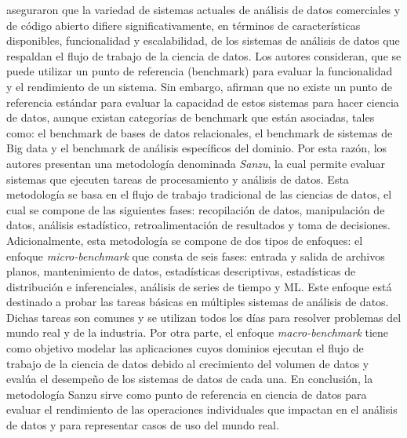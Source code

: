 \cite{Watson2017} aseguraron que la variedad de sistemas actuales de análisis de datos comerciales y de código abierto difiere significativamente, en términos de características disponibles, funcionalidad y escalabilidad, de los sistemas de análisis de datos que respaldan el flujo de trabajo de la ciencia de datos. Los autores consideran, que se puede utilizar un punto de referencia (benchmark) para evaluar la funcionalidad y el rendimiento de un sistema. Sin embargo, afirman que no existe un punto de referencia estándar para evaluar la capacidad de estos sistemas para hacer ciencia de datos, aunque existan categorías de benchmark que están asociadas, tales como: el benchmark de bases de datos relacionales, el benchmark de sistemas de Big data y el benchmark de análisis específicos del dominio. Por esta razón, los autores presentan una metodología denominada \textit{Sanzu}, la cual permite evaluar sistemas que ejecuten tareas de procesamiento y análisis de datos. Esta metodología se basa en el flujo de trabajo tradicional de las ciencias de datos, el cual se compone de las siguientes fases: recopilación de datos, manipulación de datos, análisis estadístico, retroalimentación de resultados y toma de decisiones. Adicionalmente, esta metodología se compone de dos tipos de enfoques: el enfoque \textit{micro-benchmark} que consta de seis fases: entrada y salida de archivos planos, mantenimiento de datos, estadísticas descriptivas, estadísticas de distribución e inferenciales, análisis de series de tiempo y ML. Este enfoque está destinado a probar las tareas básicas en múltiples sistemas de análisis de datos. Dichas tareas son comunes y se utilizan todos los días para resolver problemas del mundo real y de la industria. Por otra parte, el enfoque \textit{macro-benchmark} tiene como objetivo modelar las aplicaciones cuyos dominios ejecutan el flujo de trabajo de la ciencia de datos debido al crecimiento del volumen de datos y evalúa el desempeño de los sistemas de datos de cada una. En conclusión, la metodología Sanzu sirve como punto de referencia en ciencia de datos para evaluar el rendimiento de las operaciones individuales que impactan en el análisis de datos y para representar casos de uso del mundo real.

